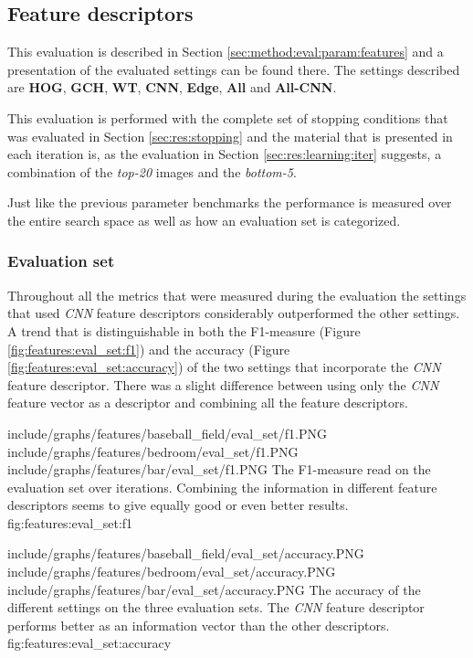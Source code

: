 
\subsection{Feature descriptors}
\label{sec:res:features}
This evaluation is described in Section \ref{sec:method:eval:param:features} and a presentation of the evaluated settings can be found there. The settings described are \textbf{HOG}, \textbf{GCH}, \textbf{WT}, \textbf{CNN}, \textbf{Edge}, \textbf{All} and \textbf{All-CNN}.

This evaluation is performed with the complete set of stopping conditions that was evaluated in Section \ref{sec:res:stopping} and the material that is presented in each iteration is, as the evaluation in Section \ref{sec:res:learning:iter} suggests, a combination of the \emph{top-20} images and the \emph{bottom-5}. 


Just like the previous parameter benchmarks the performance is measured over the entire search space as well as how an evaluation set is categorized.


\subsubsection{Evaluation set}
\label{sec:res:features:eval}


Throughout all the metrics that were measured during the evaluation the settings that used \emph{CNN} feature descriptors considerably outperformed the other settings.  A trend that is distinguishable in both the F1-measure (Figure \ref{fig:features:eval_set:f1}) and the accuracy (Figure \ref{fig:features:eval_set:accuracy}) of the two settings that incorporate the \emph{CNN} feature descriptor. There was a slight difference between using only the \emph{CNN} feature vector as a descriptor and combining all the feature descriptors.

\tripfigurenear
{include/graphs/features/baseball_field/eval_set/f1.PNG}
{include/graphs/features/bedroom/eval_set/f1.PNG}
{include/graphs/features/bar/eval_set/f1.PNG}
{The F1-measure read on the evaluation set over iterations. Combining the information in different feature descriptors seems to give equally good or even better results.}
{fig:features:eval_set:f1}

\tripfigurenear
{include/graphs/features/baseball_field/eval_set/accuracy.PNG}
{include/graphs/features/bedroom/eval_set/accuracy.PNG}
{include/graphs/features/bar/eval_set/accuracy.PNG}
{The accuracy of the different settings on the three evaluation sets. The \emph{CNN} feature descriptor performs better as an information vector than the other descriptors.}
{fig:features:eval_set:accuracy}

